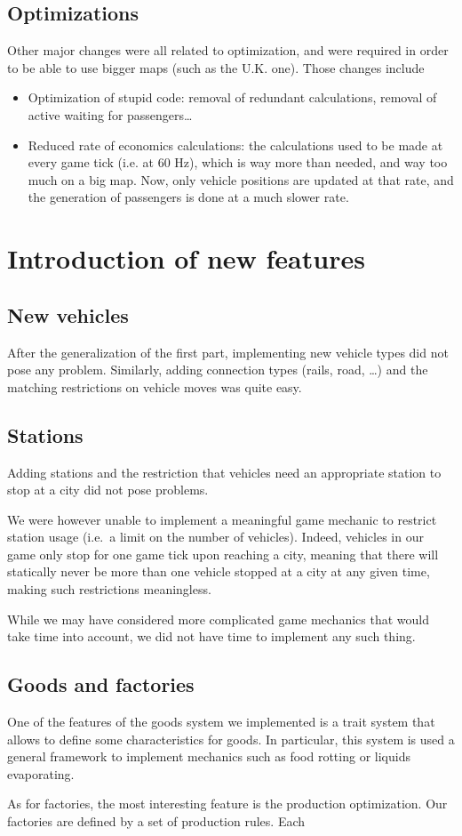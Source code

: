 \documentclass{article}
\begin{document}
\subsection{Optimizations}
Other major changes were all related to optimization, and were required in order to be able to use
bigger maps (such as the U.K. one). Those changes include
\begin{itemize}
\item Optimization of stupid code: removal of redundant calculations, removal of active waiting for passengers\dots
\item Reduced rate of economics calculations: the calculations used to be made at every game tick (i.e. at 60 Hz),
which is way more than needed, and way too much on a big map.
Now, only vehicle positions are updated at that rate, and the generation of passengers is done at a much slower rate.
\end{itemize}


\section{Introduction of new features}
\subsection{New vehicles}
After the generalization of the first part, implementing new vehicle types did not pose any problem.
Similarly, adding connection types (rails, road, \dots) and the matching restrictions on vehicle moves was quite easy.

\subsection{Stations}
Adding stations and the restriction that vehicles need an appropriate station to stop at a city did not pose problems. 

We were however unable to implement a meaningful game mechanic to restrict station usage (i.e.\ a limit on the number of vehicles).
Indeed, vehicles in our game only stop for one game tick upon reaching a city, meaning that there
will statically never be more than one vehicle stopped at a city at any given time, making such restrictions meaningless.

While we may have considered more complicated game mechanics that would take time into account,
we did not have time to implement any such thing. 

\subsection{Goods and factories}
One of the features of the goods system we implemented is a trait system that allows to define some characteristics
for goods. In particular, this system is used a general framework to implement mechanics such as food rotting or liquids evaporating.

As for factories, the most interesting feature is the production optimization.
Our factories are defined by a set of production rules.
Each 
\end{document}
